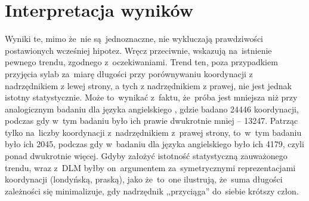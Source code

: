 \documentclass[licencjacka]{pracamgr_Kogni}
\begin{document}
    \section{Interpretacja wyników}\label{sec:interpretacja-wynikow}
    Wyniki te, mimo że~nie są~jednoznaczne, nie wykluczają prawdziwości postawionych wcześniej hipotez.
    Wręcz przeciwnie, wskazują na~istnienie pewnego trendu, zgodnego z~oczekiwaniami.
    Trend ten, poza przypadkiem przyjęcia sylab za~miarę długości przy porównywaniu koordynacji z nadrzędnikiem z lewej strony, a tych z nadrzędnikiem z prawej, nie jest jednak istotny statystycznie.
    Może to~wynikać z~faktu, że~próba jest mniejsza niż przy analogicznym badaniu dla języka angielskiego \citep{Przepiorkowski2023}, gdzie badano 24446 koordynacji, podczas gdy w~tym badaniu było ich prawie dwukrotnie mniej -- 13247.
    Patrząc tylko na~liczby koordynacji z~nadrzędnikiem z~prawej strony, to~w~tym badaniu było ich 2045, podczas gdy w~badaniu dla języka angielskiego było ich 4179, czyli ponad dwukrotnie więcej.
    Gdyby założyć istotność statystyczną zauważonego trendu, wraz z~DLM byłby on~argumentem za~symetrycznymi reprezentacjami koordynacji (londyńską, praską), jako że~to~one ilustrują, że~suma długości zależności się minimalizuje, gdy nadrzędnik ,,przyciąga'' do~siebie krótszy człon.
\end{document}
